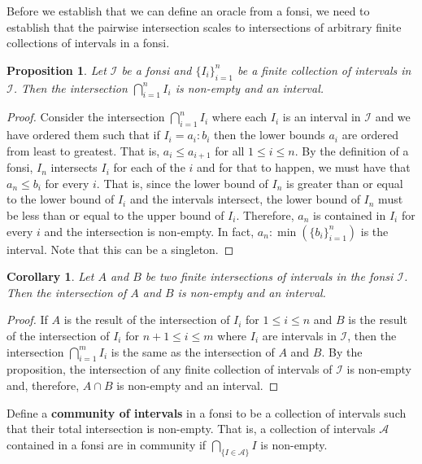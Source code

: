 \documentclass[12pt]{article}
\newtheorem{corollary}{Corollary}[subsection]
\newtheorem{proposition}{Proposition}[subsection]
\begin{document}
Before we establish that we can define an oracle from a fonsi, we need to establish that the pairwise intersection scales to intersections of arbitrary finite collections of intervals in a fonsi. 

\begin{proposition}
 Let $\mathcal{I}$ be a fonsi and $\{I_i\}_{i=1}^n$ be a finite collection of intervals in $\mathcal{I}$. Then the intersection $\bigcap_{i=1}^n I_i$ is non-empty and an interval.
\end{proposition}

\begin{proof} 
    Consider the intersection $\bigcap_{i=1}^n I_i$ where each $I_i$ is an interval in $\mathcal{I}$ and we have ordered them such that if $I_i = a_i : b_i$ then the lower bounds $a_i$ are ordered from least to greatest. That is,  $a_i \leq a_{i+1}$ for all $1 \leq i \leq n$. By the definition of a fonsi, $I_n$ intersects $I_i$ for each of the $i$ and for that to happen, we must have that $a_n \leq b_i$ for every $i$. That is, since the lower bound of $I_n$ is greater than or equal to the lower bound of $I_i$ and the intervals intersect, the lower bound of $I_n$ must be less than or equal to the upper bound of $I_i$. Therefore, $a_n$ is contained in $I_i$ for every $i$ and the intersection is non-empty. In fact, $a_n : \min(\{b_i\}_{i=1}^n)$ is the interval. Note that this can be a singleton. 
\end{proof}


\begin{corollary}
Let $A$ and $B$ be two finite intersections of intervals in the fonsi $\mathcal{I}$. Then the intersection of $A$ and $B$ is non-empty and an interval. 
\end{corollary}

\begin{proof}
    If $A$ is the result of the intersection of $I_i$ for $1 \leq i \leq n$ and $B$ is the result of the intersection of $I_i$ for $n+1 \leq i \leq m$ where $I_i$ are intervals in $\mathcal{I}$, then the intersection $\bigcap_{i=1}^m I_i$ is the same as the intersection of $A$ and $B$. By the proposition, the intersection of any finite collection of intervals of $\mathcal{I}$ is non-empty and, therefore, $A \cap B$ is non-empty and an interval. 
\end{proof}

Define a \textbf{community of intervals} in a fonsi to be  a collection of intervals such that their total intersection is non-empty. That is, a collection of intervals $\mathcal{A}$ contained in a fonsi are in community if $\bigcap_{\{I \in \mathcal{A}\}} I$ is non-empty. 
\end{document}
